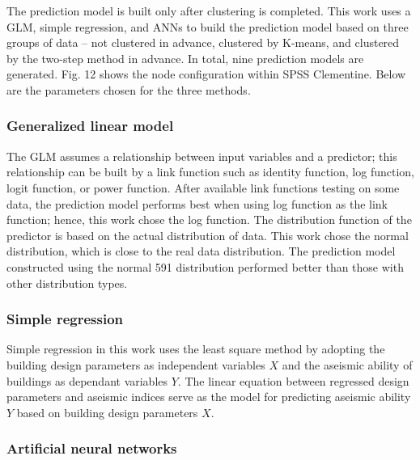 The prediction model is built only after clustering is completed. This work uses a GLM, simple regression, and ANNs to build the prediction model based on three groups of data – not clustered in advance, clustered by K-means, and clustered by the two-step method in advance. In total, nine prediction models are generated. Fig. 12 shows the node configuration within SPSS Clementine. Below are the parameters chosen for the three methods. 

\subsubsection{Generalized linear model}

The GLM assumes a relationship between input variables and a predictor; this relationship can be built by a link function such as identity function, log function, logit function, or power function. After available link functions testing on some data, the prediction model performs best when using log function as the link function; hence, this work chose the log function. The distribution function of the predictor is based on the actual distribution of data. This work chose the normal distribution, which is close to the real data distribution. The prediction model constructed using the normal 591 distribution performed better than those with other distribution types.

\subsubsection{Simple regression}

Simple regression in this work uses the least square method by adopting the building design parameters as independent variables $X$ and the aseismic ability of buildings as dependant variables $Y$. The linear equation between regressed design parameters and aseismic indices serve as the model for predicting aseismic ability $Y$ based on building design parameters $X$.

\subsubsection{Artificial neural networks}

